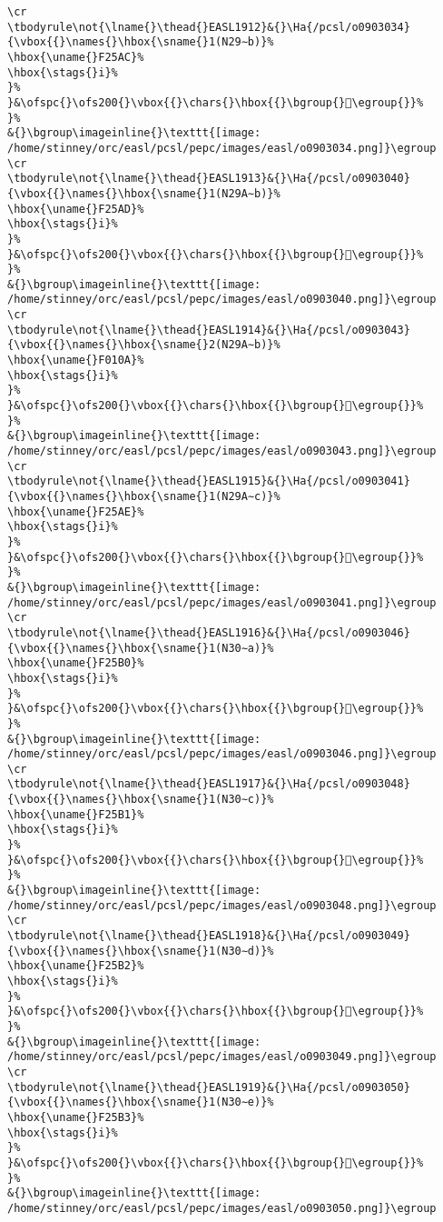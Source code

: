 \begin{verbatim}
\cr
\tbodyrule\not{\lname{}\thead{}EASL1912}&{}\Ha{/pcsl/o0903034}{\vbox{{}\names{}\hbox{\sname{}1(N29∼b)}%
\hbox{\uname{}F25AC}%
\hbox{\stags{}i}%
}%
}&\ofspc{}\ofs200{}\vbox{{}\chars{}\hbox{{}\bgroup{}󲖬\egroup{}}%
}%
&{}\bgroup\imageinline{}\texttt{[image: /home/stinney/orc/easl/pcsl/pepc/images/easl/o0903034.png]}\egroup
\cr
\tbodyrule\not{\lname{}\thead{}EASL1913}&{}\Ha{/pcsl/o0903040}{\vbox{{}\names{}\hbox{\sname{}1(N29A∼b)}%
\hbox{\uname{}F25AD}%
\hbox{\stags{}i}%
}%
}&\ofspc{}\ofs200{}\vbox{{}\chars{}\hbox{{}\bgroup{}󲖭\egroup{}}%
}%
&{}\bgroup\imageinline{}\texttt{[image: /home/stinney/orc/easl/pcsl/pepc/images/easl/o0903040.png]}\egroup
\cr
\tbodyrule\not{\lname{}\thead{}EASL1914}&{}\Ha{/pcsl/o0903043}{\vbox{{}\names{}\hbox{\sname{}2(N29A∼b)}%
\hbox{\uname{}F010A}%
\hbox{\stags{}i}%
}%
}&\ofspc{}\ofs200{}\vbox{{}\chars{}\hbox{{}\bgroup{}󰄊\egroup{}}%
}%
&{}\bgroup\imageinline{}\texttt{[image: /home/stinney/orc/easl/pcsl/pepc/images/easl/o0903043.png]}\egroup
\cr
\tbodyrule\not{\lname{}\thead{}EASL1915}&{}\Ha{/pcsl/o0903041}{\vbox{{}\names{}\hbox{\sname{}1(N29A∼c)}%
\hbox{\uname{}F25AE}%
\hbox{\stags{}i}%
}%
}&\ofspc{}\ofs200{}\vbox{{}\chars{}\hbox{{}\bgroup{}󲖮\egroup{}}%
}%
&{}\bgroup\imageinline{}\texttt{[image: /home/stinney/orc/easl/pcsl/pepc/images/easl/o0903041.png]}\egroup
\cr
\tbodyrule\not{\lname{}\thead{}EASL1916}&{}\Ha{/pcsl/o0903046}{\vbox{{}\names{}\hbox{\sname{}1(N30∼a)}%
\hbox{\uname{}F25B0}%
\hbox{\stags{}i}%
}%
}&\ofspc{}\ofs200{}\vbox{{}\chars{}\hbox{{}\bgroup{}󲖰\egroup{}}%
}%
&{}\bgroup\imageinline{}\texttt{[image: /home/stinney/orc/easl/pcsl/pepc/images/easl/o0903046.png]}\egroup
\cr
\tbodyrule\not{\lname{}\thead{}EASL1917}&{}\Ha{/pcsl/o0903048}{\vbox{{}\names{}\hbox{\sname{}1(N30∼c)}%
\hbox{\uname{}F25B1}%
\hbox{\stags{}i}%
}%
}&\ofspc{}\ofs200{}\vbox{{}\chars{}\hbox{{}\bgroup{}󲖱\egroup{}}%
}%
&{}\bgroup\imageinline{}\texttt{[image: /home/stinney/orc/easl/pcsl/pepc/images/easl/o0903048.png]}\egroup
\cr
\tbodyrule\not{\lname{}\thead{}EASL1918}&{}\Ha{/pcsl/o0903049}{\vbox{{}\names{}\hbox{\sname{}1(N30∼d)}%
\hbox{\uname{}F25B2}%
\hbox{\stags{}i}%
}%
}&\ofspc{}\ofs200{}\vbox{{}\chars{}\hbox{{}\bgroup{}󲖲\egroup{}}%
}%
&{}\bgroup\imageinline{}\texttt{[image: /home/stinney/orc/easl/pcsl/pepc/images/easl/o0903049.png]}\egroup
\cr
\tbodyrule\not{\lname{}\thead{}EASL1919}&{}\Ha{/pcsl/o0903050}{\vbox{{}\names{}\hbox{\sname{}1(N30∼e)}%
\hbox{\uname{}F25B3}%
\hbox{\stags{}i}%
}%
}&\ofspc{}\ofs200{}\vbox{{}\chars{}\hbox{{}\bgroup{}󲖳\egroup{}}%
}%
&{}\bgroup\imageinline{}\texttt{[image: /home/stinney/orc/easl/pcsl/pepc/images/easl/o0903050.png]}\egroup

\end{verbatim}
